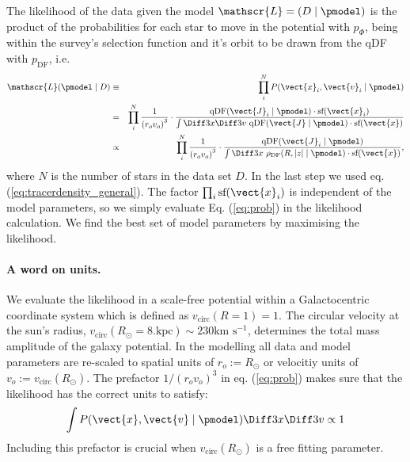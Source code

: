 The likelihood of the data given the model $\mathscr{L} = (D \mid \pmodel)$ is the product of the probabilities for each star to move in the potential with $p_\Phi$, being within the survey's selection function and it's orbit to be drawn from the qDF with $p_\text{DF}$, i.e. 
\begin{eqnarray}
\mathscr{L}(\pmodel \mid D) &\equiv& \prod_i^{N} P(\vect{x}_i,\vect{v}_i \mid \pmodel) \nonumber\\
&=& \prod_i^{N} \frac{1}{\left(r_o v_o\right)^3} \cdot \frac{\text{qDF}(\vect{J}_i \mid \pmodel) \cdot \text{sf}(\vect{x}_i)}{\int \Diff 3 x \Diff 3 v \  \text{qDF}(\vect{J} \mid \pmodel) \cdot \text{sf}(\vect{x})}\nonumber\\
&\propto& \prod_i^{N} \frac{1}{\left(r_o v_o\right)^3} \cdot \frac{\text{qDF}(\vect{J}_i \mid \pmodel)}{\int \Diff 3 x \  \rho_\text{DF}(R,|z| \mid \pmodel) \cdot \text{sf}(\vect{x})}, \label{eq:prob}
\end{eqnarray}
where $N$ is the number of stars in the data set $D$.
In the last step we used eq. (\ref{eq:tracerdensity_general}). The factor $\prod_i\text{sf}(\vect{x}_i)$ is independent of the model parameters, so we  simply evaluate Eq. (\ref{eq:prob}) in the likelihood calculation. We find the best set of model parameters by maximising the likelihood. 


\paragraph{A word on units.} We evaluate the likelihood in a scale-free potential within a Galactocentric coordinate system which is defined as $v_\text{circ}(R = 1) = 1$. The circular velocity at the sun's radius, $v_\text{circ}(R_\odot = 8. \text{kpc}) \sim 230 \text{km s$^{-1}$}$, determines the total mass amplitude of the galaxy potential. In the modelling all data and model parameters are re-scaled to spatial units of $r_o := R_\odot$ or velocitiy units of $v_o := v_\text{circ}(R_\odot )$. The prefactor $1/\left(r_o v_o\right)^3$ in eq. (\ref{eq:prob}) makes sure that the likelihood has the correct units to satisfy:
\begin{eqnarray*}
\int P(\vect{x},\vect{v} \mid \pmodel) \Diff 3 x \Diff 3 v \propto 1
\end{eqnarray*} 
Including this prefactor is crucial when $v_\text{circ}(R_\odot )$ is a free fitting parameter.

